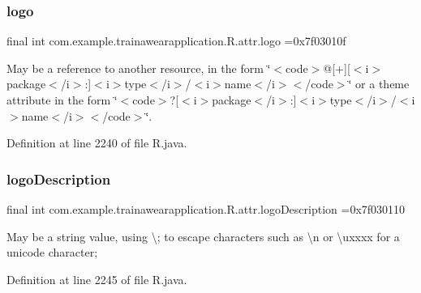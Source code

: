 \subsubsection{\texorpdfstring{logo}{logo}}
{\footnotesize\ttfamily final int com.\+example.\+trainawearapplication.\+R.\+attr.\+logo =0x7f03010f\hspace{0.3cm}{\ttfamily [static]}}

May be a reference to another resource, in the form \char`\"{}$<$code$>$@\mbox{[}+\mbox{]}\mbox{[}$<$i$>$package$<$/i$>$\+:\mbox{]}$<$i$>$type$<$/i$>$/$<$i$>$name$<$/i$>$$<$/code$>$\char`\"{} or a theme attribute in the form \char`\"{}$<$code$>$?\mbox{[}$<$i$>$package$<$/i$>$\+:\mbox{]}$<$i$>$type$<$/i$>$/$<$i$>$name$<$/i$>$$<$/code$>$\char`\"{}. 

Definition at line 2240 of file R.\+java.

\mbox{\label{classcom_1_1example_1_1trainawearapplication_1_1_r_1_1attr_a5cea25ad96a18b31dfc7356967538d3f}} 
\subsubsection{\texorpdfstring{logoDescription}{logoDescription}}
{\footnotesize\ttfamily final int com.\+example.\+trainawearapplication.\+R.\+attr.\+logo\+Description =0x7f030110\hspace{0.3cm}{\ttfamily [static]}}

May be a string value, using \textquotesingle{}\textbackslash{};\textquotesingle{} to escape characters such as \textquotesingle{}\textbackslash{}n\textquotesingle{} or \textquotesingle{}\textbackslash{}uxxxx\textquotesingle{} for a unicode character; 

Definition at line 2245 of file R.\+java.

\mbox{\label{classcom_1_1example_1_1trainawearapplication_1_1_r_1_1attr_a388991765c2fff242ef4ce3213ed5bf0}} 
